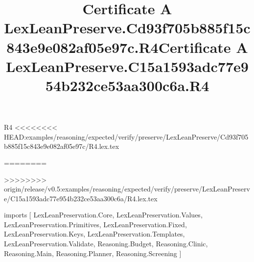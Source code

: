\begin{lexlean}{R4}
<<<<<<<< HEAD:examples/reasoning/expected/verify/preserve/LexLeanPreserve/Cd93f705b885f15c843e9e082af05e97c/R4.lex.tex
\title{Certificate A LexLeanPreserve.Cd93f705b885f15c843e9e082af05e97c.R4}
========
\title{Certificate A LexLeanPreserve.C15a1593adc77e954b232ce53aa300c6a.R4}
>>>>>>>> origin/release/v0.5:examples/reasoning/expected/verify/preserve/LexLeanPreserve/C15a1593adc77e954b232ce53aa300c6a/R4.lex.tex
\begin{coremodule}
imports [
  LexLeanPreservation.Core,
  LexLeanPreservation.Values,
  LexLeanPreservation.Primitives,
  LexLeanPreservation.Fixed,
  LexLeanPreservation.Keys,
  LexLeanPreservation.Templates,
  LexLeanPreservation.Validate,
  Reasoning.Budget,
  Reasoning.Clinic,
  Reasoning.Main,
  Reasoning.Planner,
  Reasoning.Screening
]


\end{coremodule}
\end{lexlean}
